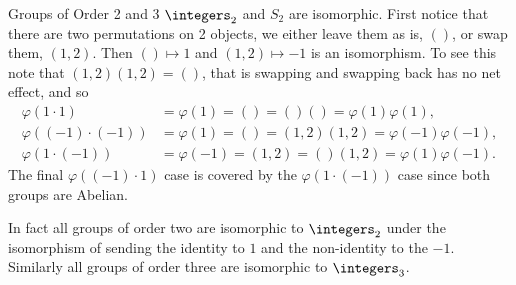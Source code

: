 \documentclass[fleqn]{NotesClass}
\begin{document}
    \begin{exm}{Groups of Order 2 and 3}{}
        \(\integers_2\) and \(S_2\) are isomorphic.
        First notice that there are two permutations on 2 objects, we either leave them as is, \(()\), or swap them, \((1, 2)\).
        Then \(() \mapsto 1\) and \((1, 2) \mapsto -1\) is an isomorphism.
        To see this note that \((1, 2)(1, 2) = ()\), that is swapping and swapping back has no net effect, and so
        \begin{align}
            \varphi(1 \cdot 1) &= \varphi(1) = () = ()() = \varphi(1)\varphi(1),\\
            \varphi((-1)\cdot (-1)) &= \varphi(1) = () = (1, 2)(1, 2) = \varphi(-1)\varphi(-1),\\
            \varphi(1 \cdot (-1)) &= \varphi(-1) = (1, 2) = ()(1, 2) = \varphi(1)\varphi(-1).
        \end{align}
        The final \(\varphi((-1)\cdot 1)\) case is covered by the \(\varphi(1\cdot (-1))\) case since both groups are Abelian.
    
        In fact all groups of order two are isomorphic to \(\integers_2\) under the isomorphism of sending the identity to \(1\) and the non-identity to the \(-1\).
        Similarly all groups of order three are isomorphic to \(\integers_3\).
    \end{exm}
    
\end{document}
